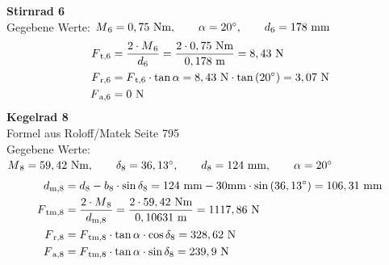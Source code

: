 \begin{center}
	\textbf{Stirnrad 6} \\
	\vspace{.5cm}
	Gegebene Werte: $M\textsubscript{6} = 0,75 \text{ Nm}, \qquad \alpha = 20^\circ, \qquad d_6 =178 \text{ mm}$
	\begin{align*}
	F\textsubscript{t,6} &= \frac{2\cdot M\textsubscript{6}}{d_6} = \frac{2 \cdot 0,75 \text{ Nm}}{0,178 \text{ m}} = 8,43 \text{ N}\\ 
	F\textsubscript{r,6} &= F\textsubscript{t,6} \cdot \tan{\alpha} =8,43 \text{ N} \cdot \tan{(20^\circ)} = 3,07 \text{ N}\\ 
	F\textsubscript{a,6} &= 0\text{ N}\\
	\end{align*}
	\newpage
	\textbf{Kegelrad 8}\\
	\vspace{.5cm}
	Formel aus Roloff/Matek Seite 795 \\
	\vspace{.3cm}
	Gegebene Werte: $M\textsubscript{8} = 59,42 \text{ Nm}, \qquad \delta_8 = 36,13^\circ, \qquad d_8 = 124 \text{ mm}, \qquad \alpha = 20^\circ $
	\begin{align*}
	d\textsubscript{m,8} &= d_8 - b_8 \cdot \sin{\delta_8} = 124 \text{ mm} - 30\text{mm} \cdot \sin{(36,13^\circ)} = 106,31 \text{ mm}\\ 
	F\textsubscript{tm,8} &= \frac{2 \cdot M\textsubscript{8}}{d\textsubscript{m,8}} = \frac{2 \cdot 59,42 \text{ Nm} } {0,10631 \text{ m}} = 1117,86 \text{ N}\\
	F\textsubscript{r,8} &= F\textsubscript{tm,8} \cdot \tan{\alpha} \cdot \cos{\delta_8} = 328,62 \text{ N}\\ 
	F\textsubscript{a,8} &= F\textsubscript{tm,8}\cdot \tan{\alpha} \cdot \sin{\delta_8} = 239,9 \text{ N} \\ 
	\end{align*}
\end{center}
\newpage
